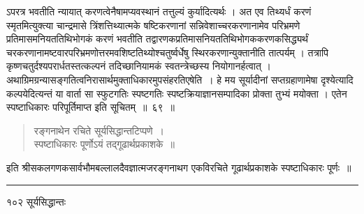 \documentclass[11pt, openany]{book}
\begin{document}
\begin{sloppypar}
\noindent ऽपरत्र भवतीति न्यायात् करणत्वेनैषामप्यवस्थानं तत्तुल्यं कुर्यादित्यर्थः । अत एव तिथ्यर्धं करणं स्मृतमित्युक्त्या चान्द्रमासे त्रिंशत्तिथ्यात्मके षष्टिकरणानां सन्निवेशाच्चरकरणानामेव परिभ्रमणे प्रतिमासमनियततिथिभोगकं करणं भवतीति तद्वारणकप्रतिमासनियततिथिभोगककरणकसिद्ध्यर्थं चरकरणानामष्टवारपरिभ्रमणोत्तरमवशिष्टतिथ्योश्चतुर्ष्वर्धेषु स्थिरकरणान्युक्तानीति तात्पर्यम् । तत्रापि कृष्णचतुर्दश्यपरार्धतस्तत्कल्पनं तदिच्छानियामकं स्वतन्त्रेच्छस्य नियोगानर्हत्वात् । अथाग्रिमग्रन्यासङ्गतित्वनिरासार्थमुक्ताधिकारमुपसंहरति\textendash एषेति~। हे मय सूर्यादीनां सप्तग्रहाणामेषा दृश्येत्यादि कल्पयेदित्यन्तं या वार्ता सा स्फुटगतिः स्पष्टगतिः स्पष्टक्रियाज्ञानसम्पादिका प्रोक्ता तुभ्यं मयोक्ता । एतेन स्पष्टाधिकारः परिपूर्तिमाप्त इति सूचितम्~॥~६९~॥
\end{sloppypar}
\begin{quote}

  {\qt रङ्गनाथेन रचिते सूर्यसिद्धान्तटिप्पणे~।\\
स्पष्टाधिकारः पूर्णोऽयं तद्गूढार्थप्रकाशके~॥}
\end{quote}
\begin{sloppypar}
 इति श्रीसकलगणकसार्वभौमबल्लालदैवज्ञात्मजरङ्गनाथग एकविरचिते गूढार्थप्रकाशके स्पष्टाधिकारः पूर्णः~॥
\end{sloppypar}

\vspace{6mm}
\begin{center}
    \rule{7em}{.5pt}
\end{center}

   
\newpage
   

 

\noindent १०२ \hspace{4cm} सूर्यसिद्धान्तः
\vspace{3mm}
\end{document}
